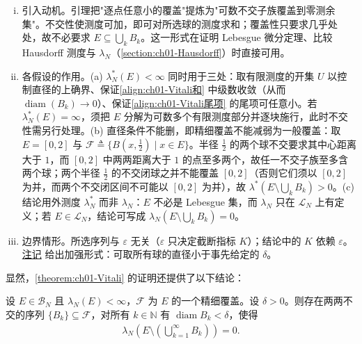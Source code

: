 \documentclass[../../main.tex]{subfiles}%
\begin{document}
\begin{remark}\label{remark:ch01-Vitali条件}
\begin{enumerate}[(i)]
\item 引入动机。引理把"逐点任意小的覆盖"提炼为"可数不交子族覆盖到零测余集"。不交性使测度可加，即可对所选球的测度求和；覆盖性只要求几乎处处，故不必要求 $E\subseteq\bigcup_kB_k$。这一形式在证明 Lebesgue 微分定理、比较 Hausdorff 测度与 $\lambda_N$（\cref{section:ch01-Hausdorff}）时直接可用。
\item 各假设的作用。(a) $\lambda_N^*(E)<\infty$ 同时用于三处：取有限测度的开集 $U$ 以控制直径的上确界、保证\eqref{align:ch01-Vitali和} 中级数收敛（从而 $\operatorname{diam}(B_k)\to0$）、保证\eqref{align:ch01-Vitali尾项} 的尾项可任意小。若 $\lambda_N^*(E)=\infty$，须把 $E$ 分解为可数多个有限测度部分并逐块施行，此时不交性需另行处理。(b) 直径条件不能删，即精细覆盖不能减弱为一般覆盖：取 $E=[0,2]$ 与 $\mathcal{F}\triangleq\{B(x,\frac{1}{2})\mid x\in E\}$。半径 $\frac{1}{2}$ 的两个球不交要求其中心距离大于 $1$，而 $[0,2]$ 中两两距离大于 $1$ 的点至多两个，故任一不交子族至多含两个球；两个半径 $\frac{1}{2}$ 的不交闭球之并不能覆盖 $[0,2]$（否则它们须以 $[0,2]$ 为并，而两个不交闭区间不可能以 $[0,2]$ 为并），故 $\lambda^*(E\setminus\bigcup_kB_k)>0$。(c) 结论用外测度 $\lambda_N^*$ 而非 $\lambda_N$：$E$ 不必是 Lebesgue 集，而 $\lambda_N$ 只在 $\mathcal{L}_N$ 上有定义；若 $E\in\mathcal{L}_N$，结论可写成 $\lambda_N(E\setminus\bigcup_kB_k)=0$。
\item 边界情形。所选序列与 $\varepsilon$ 无关（$\varepsilon$ 只决定截断指标 $K$）；结论中的 $K$ 依赖 $\varepsilon$。\hyperref[remark:ch01-Vitali精细化]{注记} 给出加强形式：可取所有球的直径小于事先给定的 $\delta$。
\end{enumerate}
\end{remark}

\begin{remark}\label{remark:ch01-Vitali精细化}
显然，\cref{theorem:ch01-Vitali} 的证明还提供了以下结论：

设 $E\in\mathcal{B}_N$ 且 $\lambda_N(E)<\infty$，$\mathcal{F}$ 为 $E$ 的一个精细覆盖。设 $\delta>0$。则存在两两不交的序列 $\{B_k\}\subseteq\mathcal{F}$，对所有 $k\in\mathbb{N}$ 有 $\operatorname{diam}B_k<\delta$，使得
\begin{align*}
\lambda_N\left(E\setminus\left(\bigcup_{k=1}^\infty B_k\right)\right)=0.
\end{align*}
\end{remark}
\end{document}
